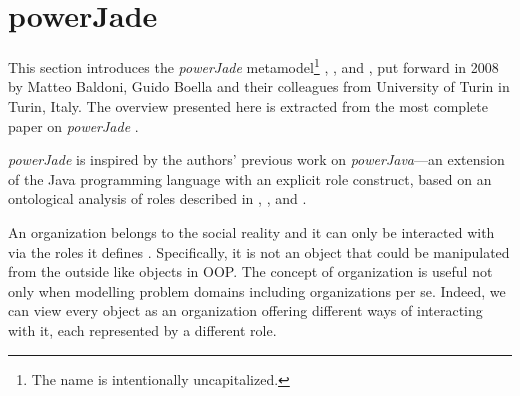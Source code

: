 
\section{powerJade}

This section introduces the \textit{powerJade} metamodel\footnote{The name is intentionally uncapitalized.} \cite{Baldoni08a}, \cite{Baldoni08b}, \cite{Baldoni09} and \cite{Baldoni10}, put forward in 2008 by Matteo Baldoni, Guido Boella and their colleagues from University of Turin in Turin, Italy.
The overview presented here is extracted from the most complete paper on \textit{powerJade} \cite{Baldoni10}.


\textit{powerJade} is inspired by the authors' previous work on \textit{powerJava}---an extension of the Java programming language with an explicit role construct, based on an ontological analysis of roles described in \cite{Baldoni05}, \cite{Baldoni06a}, \cite{Baldoni06b} and \cite{Baldoni07}.

An organization belongs to the social reality and it can only be interacted with via the roles it defines \cite{Boella06}.
Specifically, it is not an object that could be manipulated from the outside like objects in OOP.
The concept of organization is useful not only when modelling problem domains including organizations per se.
Indeed, we can view every object as an organization offering different ways of interacting with it, each represented by a different role.

